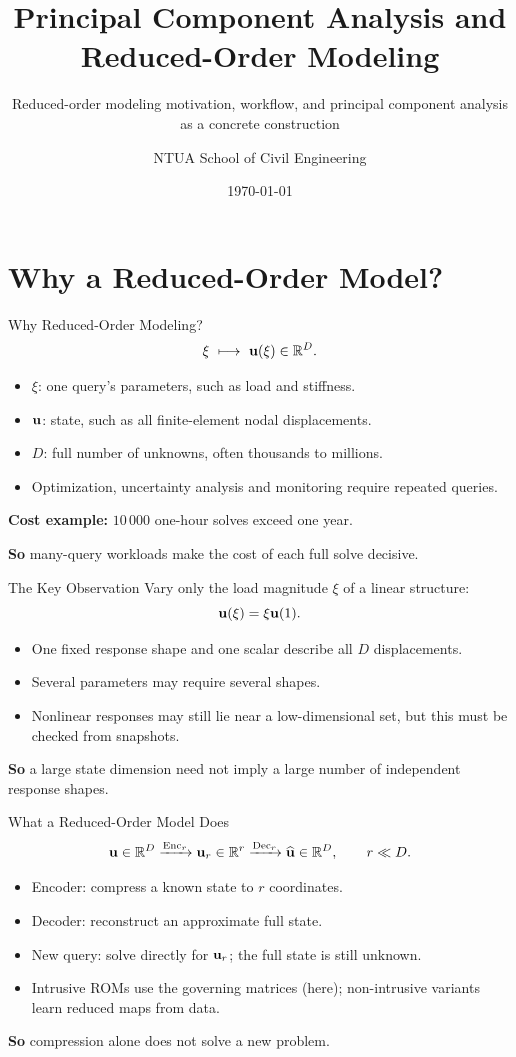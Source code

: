 \documentclass[10pt,aspectratio=169]{ntuabeamer}
\title{Principal Component Analysis and Reduced-Order Modeling}
\subtitle{Reduced-order modeling motivation, workflow, and principal component analysis as a concrete construction}
\author{NTUA School of Civil Engineering}
\date{\today}
\newcommand{\takeaway}[1]{\par\vspace{0.7em}\textcolor{ntuablue}{\textbf{So} #1}\par}
\begin{document}
\begin{frame}[plain]
  \makepresentationtitle
\end{frame}

\section{Why a Reduced-Order Model?}

\begin{frame}{Why Reduced-Order Modeling?}
\small
\[
 \xi\ \longmapsto\ \mathbf{u}(\xi)\in\mathbb R^D.
\]
\begin{itemize}
\item $\xi$: one query's parameters, such as load and stiffness.
\item $\mathbf{u}$: state, such as all finite-element nodal displacements.
\item $D$: full number of unknowns, often thousands to millions.
\item Optimization, uncertainty analysis and monitoring require repeated queries.
\end{itemize}
\textbf{Cost example:} $10\,000$ one-hour solves exceed one year.
\takeaway{many-query workloads make the cost of each full solve decisive.}
\end{frame}

\begin{frame}{The Key Observation}
\small
Vary only the load magnitude $\xi$ of a linear structure:
\[
 \mathbf{u}(\xi)=\xi\mathbf{u}(1).
\]
\begin{itemize}
\item One fixed response shape and one scalar describe all $D$ displacements.
\item Several parameters may require several shapes.
\item Nonlinear responses may still lie near a low-dimensional set, but this must be checked from snapshots.
\end{itemize}
\takeaway{a large state dimension need not imply a large number of independent response shapes.}
\end{frame}

\begin{frame}{What a Reduced-Order Model Does}
\small
\[
 \mathbf{u}\in\mathbb R^D\xrightarrow{\mathrm{Enc}_r}\mathbf{u}_r\in\mathbb R^r
 \xrightarrow{\mathrm{Dec}_r}\widehat{\mathbf{u}}\in\mathbb R^D,\qquad r\ll D.
\]
\begin{itemize}
\item Encoder: compress a known state to $r$ coordinates.
\item Decoder: reconstruct an approximate full state.
\item New query: solve directly for $\mathbf{u}_r$; the full state is still unknown.
\item Intrusive ROMs use the governing matrices (here); non-intrusive variants learn reduced maps from data.
\end{itemize}
\takeaway{compression alone does not solve a new problem.}
\end{frame}
\end{document}
